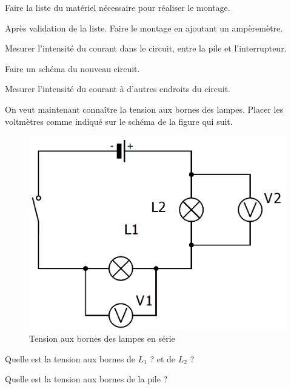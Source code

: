 \documentclass[a4paper,11pt]{exam}
\begin{document}
\begin{questions}
	
	
	\question Faire la liste du matériel nécessaire pour réaliser le montage.
	
	\fillwithdottedlines{3cm}
	\question Après validation de la liste. Faire le montage en ajoutant un ampèremètre.
	
	\question Mesurer l'intensité du courant dans le circuit, entre la pile et l'interrupteur.
		
	\fillwithdottedlines{1cm}	
	
	\question Faire un schéma du nouveau circuit.
	\makeemptybox{6.5cm}
	
	\question Mesurer l'intensité du courant à d'autres endroits du circuit.
	\fillwithdottedlines{1cm}
	
	\question On veut maintenant connaître la tension aux bornes des lampes. Placer les voltmètres comme indiqué sur le schéma de la figure qui suit.
	
	\begin{figure}[h!]
		\begin{center}
			\includegraphics[scale=0.25]{img/tension_serie}
		\end{center}		
		
		\label{fig:tension_serie}
		\caption{Tension aux bornes des lampes en série}
	\end{figure}
	\question Quelle est la tension aux bornes de $L_1$ ? et de $L_2$ ?
	\fillwithdottedlines{2cm}
	
	\question Quelle est la tension aux bornes de la pile ?
	\fillwithdottedlines{2cm}

\end{questions}
\end{document}
